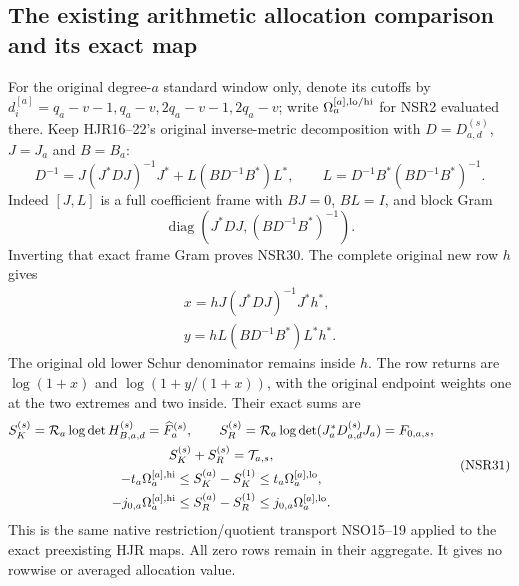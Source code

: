 \documentclass[11pt,a4paper]{article}
\begin{document}
\subsection{The existing arithmetic allocation comparison and its exact map}
For the original degree-$a$ standard window only, denote
its cutoffs by $d_i^{[a]}=q_a-v-1,q_a-v,2q_a-v-1,2q_a-v$;
write $\Omega_a^{[a],{\rm lo/hi}}$ for NSR2 evaluated
there. Keep HJR16--22's original inverse-metric
decomposition with $D=D_{a,d}^{(s)}$, $J=J_a$ and
$B=B_a$:
\[
 D^{-1}=J(J^*DJ)^{-1}J^*
              +L(BD^{-1}B^*)L^*,\qquad
 L=D^{-1}B^*(BD^{-1}B^*)^{-1}.
 \tag{NSR30}
\]
Indeed $[J,L]$ is a full coefficient frame with
$BJ=0$, $BL=I$, and block Gram
\[
 \operatorname{diag}(J^*DJ,(BD^{-1}B^*)^{-1}).
\]
Inverting that exact frame Gram proves NSR30.
The complete original new row $h$ gives
\[
 \begin{gathered}
 x=hJ(J^*DJ)^{-1}J^*h^*,\\
 y=hL(BD^{-1}B^*)L^*h^*.
 \end{gathered}
\]
The original old lower Schur denominator remains inside $h$.
The row returns are
$\log(1+x)$ and $\log(1+y/(1+x))$, with the original
endpoint weights one at the two extremes and two inside.
Their exact sums are
\[
 \begin{gathered}
 S_K^{(s)}=\mathcal R_a\log\det H_{B,a,d}^{(s)}
                 =\widehat F_a^{(s)},\qquad
 S_R^{(s)}=\mathcal R_a\log\det(J_a^*D_{a,d}^{(s)}J_a)
                 =F_{0,a,s},\\
 S_K^{(s)}+S_R^{(s)}=\mathcal T_{a,s},\\
 -t_a\Omega_a^{[a],{\rm hi}}\le S_K^{(a)}-S_K^{(1)}
                          \le t_a\Omega_a^{[a],{\rm lo}},\\
 -j_{0,a}\Omega_a^{[a],{\rm hi}}\le S_R^{(a)}-S_R^{(1)}
                          \le j_{0,a}\Omega_a^{[a],{\rm lo}} .
 \end{gathered}\tag{NSR31}
\]
This is the same native restriction/quotient transport
NSO15--19 applied to the exact preexisting HJR maps.
All zero rows remain in their aggregate. It gives no
rowwise or averaged allocation value.
\end{document}

